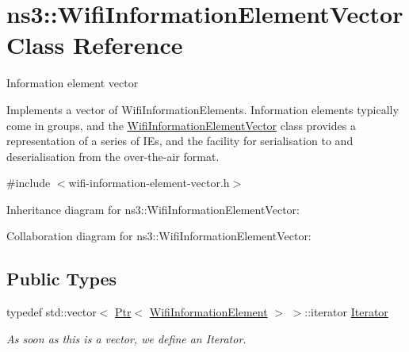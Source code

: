 \hypertarget{classns3_1_1WifiInformationElementVector}{}\section{ns3\+:\+:Wifi\+Information\+Element\+Vector Class Reference}
\label{classns3_1_1WifiInformationElementVector}


Information element vector

Implements a vector of Wifi\+Information\+Elements. Information elements typically come in groups, and the \hyperlink{classns3_1_1WifiInformationElementVector}{Wifi\+Information\+Element\+Vector} class provides a representation of a series of I\+Es, and the facility for serialisation to and deserialisation from the over-\/the-\/air format.  




{\ttfamily \#include $<$wifi-\/information-\/element-\/vector.\+h$>$}



Inheritance diagram for ns3\+:\+:Wifi\+Information\+Element\+Vector\+:


Collaboration diagram for ns3\+:\+:Wifi\+Information\+Element\+Vector\+:
\subsection*{Public Types}
\begin{DoxyCompactItemize}
\item 
typedef std\+::vector$<$ \hyperlink{classns3_1_1Ptr}{Ptr}$<$ \hyperlink{classns3_1_1WifiInformationElement}{Wifi\+Information\+Element} $>$ $>$\+::iterator \hyperlink{classns3_1_1WifiInformationElementVector_a19429192ca24ca8c4c51fe1f998e0a2f}{Iterator}
\begin{DoxyCompactList}\small\item\em As soon as this is a vector, we define an Iterator. \end{DoxyCompactList}\end{DoxyCompactItemize}

